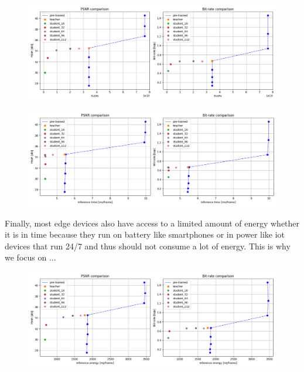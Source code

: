 \begin{figure}
    \centering
    \includegraphics[width=15cm]{img/kd_lic_7.png}
    \caption[]{}
    \label{kd_lic_7}
\end{figure}

\begin{figure}
    \centering
    \includegraphics[width=15cm]{img/kd_lic_8.png}
    \caption[]{}
    \label{kd_lic_8}
\end{figure}

Finally, most edge devices also have access to a limited amount of energy whether it is in time because they run on battery like smartphones or in power like \acrshort{iot} devices that run 24/7 and thus should not consume a lot of energy. This is why we focus on ... %

\begin{figure}
    \centering
    \includegraphics[width=15cm]{img/kd_lic_9.png}
    \caption[]{}
    \label{kd_lic_9}
\end{figure}

